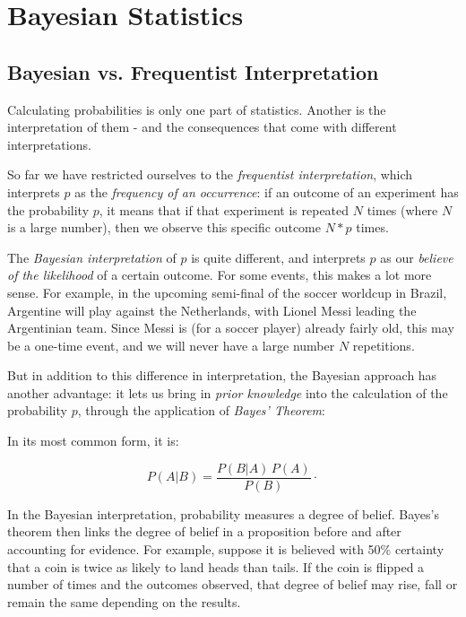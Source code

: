 \chapter{Bayesian Statistics}\label{chapter:Bayes}

\section{Bayesian vs. Frequentist Interpretation}

Calculating probabilities is only one part of statistics. Another is the interpretation of them - and the consequences that come with different interpretations.

So far we have restricted ourselves to the \emph{frequentist interpretation}, which interprets $p$ as the \emph{frequency of an occurrence}: if an outcome of an experiment has the probability $p$, it means that if that experiment is repeated $N$ times (where $N$ is a large number), then we observe this specific outcome $N*p$ times.

The \emph{Bayesian interpretation} of $p$ is quite different, and interprets $p$ as our \emph{believe of the likelihood} of a certain outcome. For some events, this makes a lot more sense. For example, in the upcoming semi-final of the soccer worldcup in Brazil, Argentine will play against the Netherlands, with Lionel Messi leading the Argentinian team. Since Messi is (for a soccer player) already fairly old, this may be a one-time event, and we will never have a large number $N$ repetitions.

But in addition to this difference in interpretation, the Bayesian approach has another advantage: it lets us bring in \emph{prior knowledge} into the calculation of the probability $p$, through the application of \emph{Bayes' Theorem}:

In its most common form, it is:

\begin{equation}\label{eq:BayesTheorem}
  P(A|B) = \frac{P(B | A)\, P(A)}{P(B)}\cdot
\end{equation}

In the Bayesian interpretation, probability measures a degree of belief. Bayes's theorem then links the degree of belief in a proposition before and after accounting for evidence. For example, suppose it is believed with 50\% certainty that a coin is twice as likely to land heads than tails. If the coin is flipped a number of times and the outcomes observed, that degree of belief may rise, fall or remain the same depending on the results.

